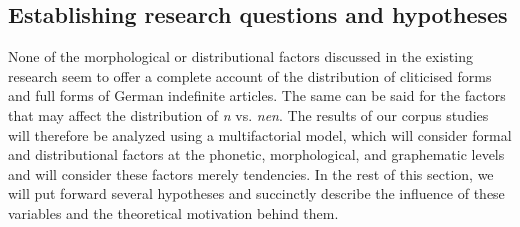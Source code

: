\subsection{Establishing research questions and hypotheses}
\label{subsec:15researchQuestions}

None of the morphological or distributional factors discussed in the existing research seem to offer a complete account of the distribution of cliticised forms and full forms of German indefinite articles.
The same can be said for the factors that may affect the distribution of \textit{n} vs. \textit{nen}.
The results of our corpus studies will therefore be analyzed using a multifactorial model, which will consider formal and distributional factors at the phonetic, morphological, and graphematic levels and will consider these factors merely tendencies.
In the rest of this section, we will put forward several hypotheses and succinctly describe the influence of these variables and the theoretical motivation behind them.

